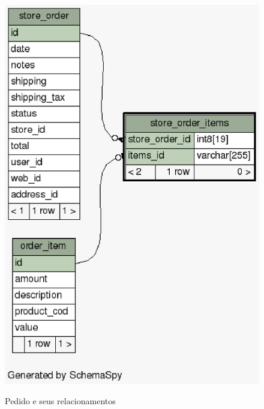\documentclass[a4paper,12pt]{monografia}
\begin{document}
\begin{figure}[H]
\centering
\caption{Pedido e seus relacionamentos}
\centering
\includegraphics[scale=0.7]{img/diagramas/schema/store_order_items.1degree.png.eps}\\
\end{figure}
\end{document}
